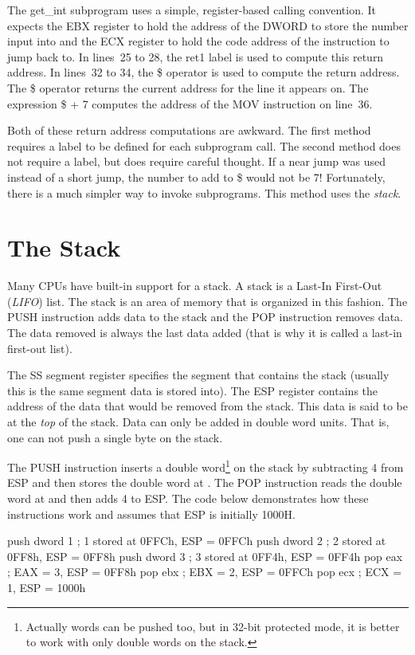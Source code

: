 The {\code get\_int} subprogram uses a simple, register-based calling
convention. It expects the EBX register to hold the address of the
DWORD to store the number input into and the ECX register to hold the
code address of the instruction to jump back to. In lines~25 to 28,
the {\code ret1} label is used to compute this return address. In
lines~32 to 34, the {\code \$} operator is used to compute the return
address. The {\code \$} operator returns the current address for the
line it appears on. The expression {\code \$ + 7} computes the address
of the {\code MOV} instruction on line~36.

Both of these return address computations are awkward. The first method
requires a label to be defined for each subprogram call. The second method
does not require a label, but does require careful thought. If a near jump
was used instead of a short jump, the number to add to {\code \$} would not
be 7! Fortunately, there is a much simpler way to invoke subprograms. This
method uses the \emph{stack}.

\section{The Stack}

Many CPUs have built-in support for a stack. A stack is a Last-In First-Out
(\emph{LIFO}) list. The stack is an area of memory that is organized in this
fashion. The {\code PUSH} instruction adds data to the stack and the
{\code POP} instruction removes data. The data removed is always the last
data added (that is why it is called a last-in first-out list).

The SS segment register specifies the segment that contains the stack (usually
this is the same segment data is stored into). The ESP register contains the
address of the data that would be removed from the stack. This data is said
to be at the \emph{top} of the stack. Data can only be added in double word
units. That is, one can not push a single byte on the stack.

The {\code PUSH} instruction inserts a double word\footnote{Actually
words can be pushed too, but in 32-bit protected mode, it is better to
work with only double words on the stack.} on the stack by subtracting
4 from ESP and then stores the double word at {\code [ESP]}. The
{\code POP} instruction reads the double word at {\code [ESP]} and
then adds 4 to ESP. The code below demonstrates how these instructions
work and assumes that ESP is initially {\code 1000H}.
\begin{AsmCodeListing}[frame=none]
      push   dword 1    ; 1 stored at 0FFCh, ESP = 0FFCh
      push   dword 2    ; 2 stored at 0FF8h, ESP = 0FF8h
      push   dword 3    ; 3 stored at 0FF4h, ESP = 0FF4h
      pop    eax        ; EAX = 3, ESP = 0FF8h
      pop    ebx        ; EBX = 2, ESP = 0FFCh
      pop    ecx        ; ECX = 1, ESP = 1000h
\end{AsmCodeListing}

